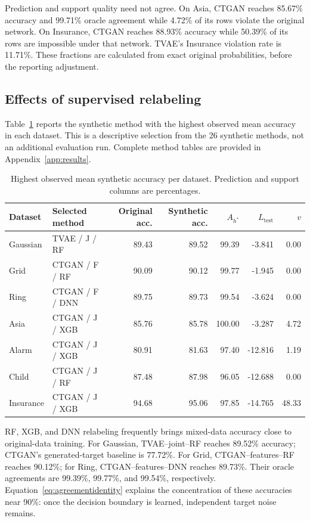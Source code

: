 \documentclass[11pt,letterpaper]{article}
\newcommand{\Ltest}{L_{\mathrm{test}}}
\begin{document}
Prediction and support quality need not agree. On Asia, CTGAN reaches 85.67\% accuracy and 99.71\% oracle agreement while 4.72\% of its rows violate the original network. On Insurance, CTGAN reaches 88.93\% accuracy while 50.39\% of its rows are impossible under that network. TVAE's Insurance violation rate is 11.71\%. These fractions are calculated from exact original probabilities, before the reporting adjustment.

\subsection{Effects of supervised relabeling}
Table~\ref{tab:accuracyselection} reports the synthetic method with the highest observed mean accuracy in each dataset. This is a descriptive selection from the 26 synthetic methods, not an additional evaluation run. Complete method tables are provided in Appendix~\ref{app:results}.
\begin{table}[H]\centering
\caption{Highest observed mean synthetic accuracy per dataset. Prediction and support columns are percentages.}\label{tab:accuracyselection}
\footnotesize
\begin{tabular}{llrrrrr}\toprule
Dataset & Selected method & Original acc. & Synthetic acc. & $A_{h^*}$ & $\Ltest$ & $v$\\\midrule
Gaussian & TVAE / J / RF & 89.43 & 89.52 & 99.39 & -3.841 & 0.00\\
Grid & CTGAN / F / RF & 90.09 & 90.12 & 99.77 & -1.945 & 0.00\\
Ring & CTGAN / F / DNN & 89.75 & 89.73 & 99.54 & -3.624 & 0.00\\
Asia & CTGAN / J / XGB & 85.76 & 85.78 & 100.00 & -3.287 & 4.72\\
Alarm & CTGAN / J / XGB & 80.91 & 81.63 & 97.40 & -12.816 & 1.19\\
Child & CTGAN / J / RF & 87.48 & 87.98 & 96.05 & -12.688 & 0.00\\
Insurance & CTGAN / J / XGB & 94.68 & 95.06 & 97.85 & -14.765 & 48.33\\
\bottomrule\end{tabular}
\end{table}
RF, XGB, and DNN relabeling frequently brings mixed-data accuracy close to original-data training. For Gaussian, TVAE--joint--RF reaches 89.52\% accuracy; CTGAN's generated-target baseline is 77.72\%. For Grid, CTGAN--features--RF reaches 90.12\%; for Ring, CTGAN--features--DNN reaches 89.73\%. Their oracle agreements are 99.39\%, 99.77\%, and 99.54\%, respectively. Equation~\eqref{eq:agreementidentity} explains the concentration of these accuracies near 90\%: once the decision boundary is learned, independent target noise remains.
\end{document}
